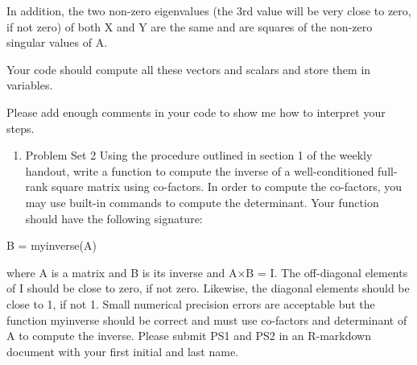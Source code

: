 \documentclass[]{article}
\providecommand{\tightlist}{%
  \setlength{\itemsep}{0pt}\setlength{\parskip}{0pt}}
\begin{document}
In addition, the two non-zero eigenvalues (the 3rd value will be very
close to zero, if not zero) of both X and Y are the same and are squares
of the non-zero singular values of A.

Your code should compute all these vectors and scalars and store them in
variables.

Please add enough comments in your code to show me how to interpret your
steps.

\begin{enumerate}
\def\labelenumi{\arabic{enumi}.}
\setcounter{enumi}{1}
\tightlist
\item
  Problem Set 2 Using the procedure outlined in section 1 of the weekly
  handout, write a function to compute the inverse of a well-conditioned
  full-rank square matrix using co-factors. In order to compute the
  co-factors, you may use built-in commands to compute the determinant.
  Your function should have the following signature:
\end{enumerate}

B = myinverse(A)

where A is a matrix and B is its inverse and A×B = I. The off-diagonal
elements of I should be close to zero, if not zero. Likewise, the
diagonal elements should be close to 1, if not 1. Small numerical
precision errors are acceptable but the function myinverse should be
correct and must use co-factors and determinant of A to compute the
inverse. Please submit PS1 and PS2 in an R-markdown document with your
first initial and last name.
\end{document}
